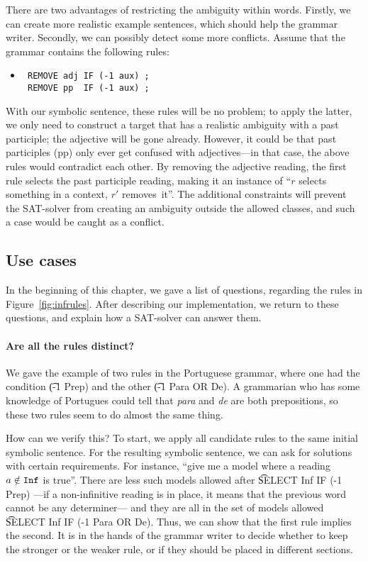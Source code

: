 {{There are two advantages of restricting the ambiguity within words.
Firstly, we can create more realistic example sentences, which should help the grammar writer.
Secondly, we can possibly detect some more conflicts. Assume that the grammar contains the following rules:

 \begin{itemize}
 \item[] 
\begin{verbatim}
 REMOVE adj IF (-1 aux) ;
 REMOVE pp  IF (-1 aux) ;
 \end{verbatim}
 \end{itemize}

 With our symbolic sentence, these rules will be no problem; to apply the latter, we only need to construct a target that has a realistic ambiguity with a past participle; the adjective will be gone already.
However, it could be that past participles (pp) only ever get confused with adjectives---in that case, the above rules would contradict each other.
 By removing the adjective reading, the first rule selects the past participle reading, making it an instance of ``$r$ selects something in a context, $r'$ removes~it''. 
The additional constraints will prevent the SAT-solver from creating an ambiguity outside the allowed classes, and such a case would be caught as a conflict.

\subsection{Use cases}

In the beginning of this chapter, we gave a list of questions, regarding the rules in Figure~\ref{fig:infrules}. After describing our implementation, we return to these questions, and explain how a SAT-solver can answer them.


\paragraph{Are all the rules distinct?} We gave the example of two rules in the Portuguese grammar, where one had the condition \t{(-1 Prep)} and the other \t{(-1 Para OR De)}. A grammarian who has some knowledge of Portugues could tell that {\em para} and {\em de} are both prepositions, so these two rules seem to do almost the same thing.

How can we verify this? To start, we apply all candidate rules to the same initial symbolic sentence. For the resulting symbolic sentence, we can ask for solutions with certain requirements.
For instance, ``give me a model where a reading $a \notin \texttt{Inf}$ is true''.
There are less such models allowed after \t{SELECT Inf IF (-1 Prep)}
---if a non-infinitive reading is in place, it means that the previous word cannot be any determiner---
and they are all in the set of models allowed \t{SELECT Inf IF (-1 Para OR De)}. Thus, we can show that the first rule implies the second. It is in the hands of the grammar writer to decide whether to keep the stronger or the weaker rule, or if they should be placed in different sections.


}}
